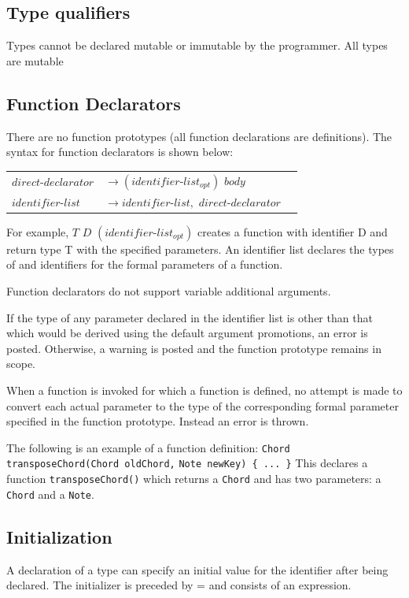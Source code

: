\documentclass[12pt,A4]{book}
\begin{document}
\subsection{Type qualifiers}
Types cannot be declared mutable or immutable by the programmer.  All types are mutable
\subsection{Function Declarators}
There are no function prototypes (all function declarations are definitions).  The syntax for function declarators is shown below:

\begin{tabular}{l l l}
$direct\mbox{-}declarator $ & $\rightarrow (identifier\mbox{-}list_{opt})$ { $body$ } \\
$identifier\mbox{-}list$  & $\rightarrow identifier\mbox{-}list,$ $direct\mbox{-}declarator$
\end{tabular}

For example,
$T$ $D$ $(identifier\mbox{-}list_{opt})$
creates a function with identifier D and return type T with the specified parameters. An identifier list declares the types of and identifiers for the formal parameters of a function.

Function declarators do not support variable additional arguments.  

If the type of any parameter declared in the identifier list is other than that which would be derived using the default argument promotions, an error is posted.  Otherwise, a warning is posted and the function prototype remains in scope.

When a function is invoked for which a function is defined, no attempt is made to convert each actual parameter to the type of the corresponding formal parameter specified in the function prototype. Instead an error is thrown.  

The following is an example of a function definition:
\verb|Chord transposeChord(Chord oldChord,| \verb|Note newKey) { ... }|
This declares a function \verb|transposeChord()| which returns a \verb|Chord| and has two parameters: a \verb|Chord| and a \verb|Note|.  
\subsection{Initialization}
A declaration of a type can specify an initial value for the identifier after being declared.  The initializer is preceded by = and consists of an expression.
\end{document}
